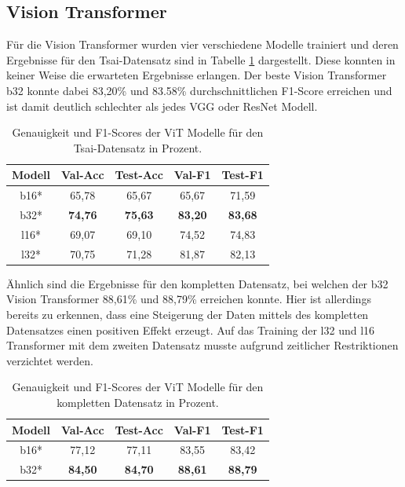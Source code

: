 \documentclass[twoside,a4paper]{IEEEtran}
\begin{document}
\subsection{Vision Transformer}
Für die Vision Transformer wurden vier verschiedene Modelle trainiert und deren Ergebnisse für den Tsai-Datensatz sind in Tabelle \ref{vit_ergebnis_tsai} dargestellt. Diese konnten in keiner Weise die erwarteten Ergebnisse erlangen. Der beste Vision Transformer b32 konnte dabei 83,20\% und 83.58\% durchschnittlichen F1-Score erreichen und ist damit deutlich schlechter als jedes VGG oder ResNet Modell.
\begin{table}[!htb]
	\caption{Genauigkeit und F1-Scores der ViT Modelle für den Tsai-Datensatz in Prozent.}
	\label{vit_ergebnis_tsai}
	\centering
	\begin{tabular}{|c|c|c|c|c|}
		\hline
		Modell & Val-Acc & Test-Acc & Val-F1 & Test-F1\\
		\hline
		\hline
		b16* & 65,78 & 65,67 & 65,67 & 71,59\\
		\hline
		b32* & \textbf{74,76} & \textbf{75,63} & \textbf{83,20} & \textbf{83,68}\\
		\hline
		l16* & 69,07 & 69,10 & 74,52 & 74,83\\
		\hline
		l32* & 70,75 & 71,28 & 81,87 & 82,13\\
		\hline 
	\end{tabular}
\end{table}

Ähnlich sind die Ergebnisse für den kompletten Datensatz, bei welchen der b32 Vision Transformer 88,61\% und 88,79\% erreichen konnte. Hier ist allerdings bereits zu erkennen, dass eine Steigerung der Daten mittels des kompletten Datensatzes einen positiven Effekt erzeugt. Auf das Training der l32 und l16 Transformer mit dem zweiten Datensatz musste aufgrund zeitlicher Restriktionen verzichtet werden.
\begin{table}[!htb]
	\caption{Genauigkeit und F1-Scores der ViT Modelle für den kompletten Datensatz in Prozent.}
	\label{vit_ergebnis_full}
	\centering
	\begin{tabular}{|c|c|c|c|c|}
		\hline
		Modell & Val-Acc & Test-Acc & Val-F1 & Test-F1\\
		\hline
		\hline 
		b16* & 77,12 & 77,11 & 83,55 & 83,42\\
		\hline
		b32* & \textbf{84,50} & \textbf{84,70} & \textbf{88,61} & \textbf{88,79}\\
		\hline 
	\end{tabular}
\end{table}
\end{document}
